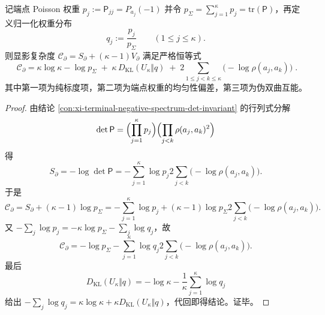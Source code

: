 \begin{conclusion}\label{con:xi-terminal-pick-poisson-visibility-complexity-kl-energy-split}
记端点 Poisson 权重
\(
p_j:=\mathsf P_{jj}=P_{a_j}(-1)
\)
并令 \(p_\Sigma=\sum_{j=1}^{\kappa}p_j=\mathrm{tr}(\mathsf P)\)，再定义归一化权重分布
\[
q_j:=\frac{p_j}{p_\Sigma}\qquad(1\le j\le\kappa).
\]
则显影复杂度
\(
\mathscr{C}_{\partial}=S_{\partial}+(\kappa-1)V_{\partial}
\)
满足严格恒等式
\[
\boxed{\;
\mathscr{C}_{\partial}
=\kappa\log\kappa-\log p_\Sigma
\;+\;\kappa\,D_{\mathrm{KL}}(U_\kappa\Vert q)
\;+\;2\sum_{1\le j<k\le\kappa}\bigl(-\log\rho(a_j,a_k)\bigr)\; } .
\]
其中第一项为纯标度项，第二项为端点权重的均匀性偏差，第三项为伪双曲互能。
\end{conclusion}
\begin{proof}
由结论 \ref{con:xi-terminal-negative-spectrum-det-invariant} 的行列式分解
\[
\det\mathsf P=\Bigl(\prod_{j=1}^{\kappa}p_j\Bigr)\Bigl(\prod_{j<k}\rho(a_j,a_k)^2\Bigr)
\]
得
\[
S_{\partial}=-\log\det\mathsf P
=-\sum_{j=1}^{\kappa}\log p_j
2\sum_{j<k}\bigl(-\log\rho(a_j,a_k)\bigr).
\]
于是
\[
\mathscr{C}_{\partial}
=S_{\partial}+(\kappa-1)\log p_\Sigma
=-\sum_{j=1}^{\kappa}\log p_j+(\kappa-1)\log p_\Sigma
2\sum_{j<k}\bigl(-\log\rho(a_j,a_k)\bigr).
\]
又 \(-\sum_j\log p_j=-\kappa\log p_\Sigma-\sum_j\log q_j\)，故
\[
\mathscr{C}_{\partial}
=-\log p_\Sigma-\sum_{j=1}^{\kappa}\log q_j
2\sum_{j<k}\bigl(-\log\rho(a_j,a_k)\bigr).
\]
最后
\[
D_{\mathrm{KL}}(U_\kappa\Vert q)
=-\log\kappa-\frac1\kappa\sum_{j=1}^{\kappa}\log q_j
\]
给出 \(-\sum_j\log q_j=\kappa\log\kappa+\kappa D_{\mathrm{KL}}(U_\kappa\Vert q)\)，代回即得结论。证毕。
\end{proof}

